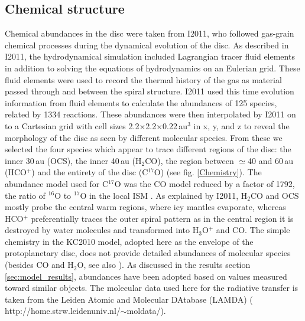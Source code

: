 \documentclass[useAMS,usenatbib]{mn2e}
\begin{document}
\subsection{Chemical structure} \label{subsec:chemical_structure}
Chemical abundances in the disc were taken from I2011, who followed gas-grain chemical processes during the dynamical evolution of the disc. As described in I2011, the hydrodynamical simulation included Lagrangian tracer fluid elements in addition to solving the equations of hydrodynamics on an Eulerian grid.  These fluid elements were used to record the thermal history of the gas as material passed through and between the spiral structure. I2011 used this time evolution information from fluid elements to calculate the abundances of 125 species, related by 1334 reactions.  These abundances were then interpolated by I2011 on to a Cartesian grid with cell sizes 2.2$\times$2.2$\times$0.22$\,$au$^3$ in x, y, and z to reveal the morphology of the disc as seen by different molecular species. From these we selected the four species which appear to trace different regions of the disc: the inner 30\,au (OCS), the inner 40\,au (H$_2$CO),  the region between $\simeq$40 and 60\,au (HCO$^+$) and the entirety of the disc (C$^{17}$O) (see fig. \ref{Chemistry}). The abundance model used for C$^{17}$O was the CO model reduced by a factor of 1792, the ratio of $^{16}$O to $^{17}$O in the local ISM \citep{Wilson1994}. As explained by I2011,  H$_2$CO and OCS mostly probe the central warm regions, where icy mantles evaporate, whereas HCO$^+$ preferentially traces the outer spiral pattern as in the central region it is destroyed by water molecules and transformed into H$_3$O$^+$ and CO. The simple chemistry in the KC2010 model, adopted here as the envelope of the protoplanetary disc, does not provide detailed abundances of molecular species (besides CO and H$_2$O, see also \citealt{Caselli2012}). As discussed in the results section \ref{sec:model_results}, abundances have been adopted based on values measured toward similar objects. The molecular data used here for the radiative transfer is taken from the Leiden Atomic and Molecular DAtabase (LAMDA) (\citealt{Schoier2005} http://home.strw.leidenuniv.nl/$\sim$moldata/).
\end{document}
